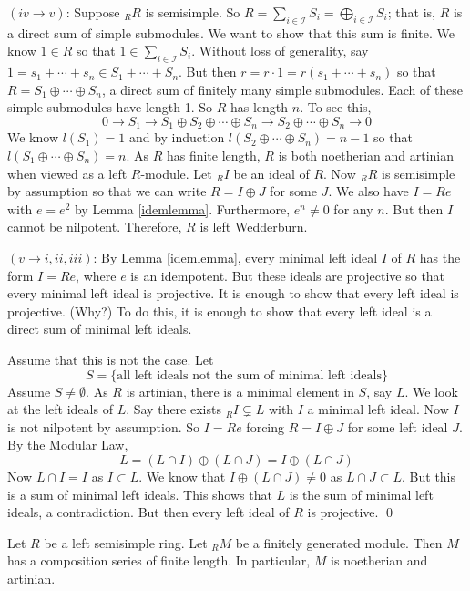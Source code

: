 $(iv \rightarrow v)$: Suppose $_R R$ is semisimple. So $R=\sum_{i \in \mathcal{I}} S_i=\bigoplus_{i \in \mathcal{I}} S_i$; that is, $R$ is a direct sum of simple submodules. We want to show that this sum is finite. We know $1 \in R$ so that $1 \in \sum_{i \in \mathcal{I}} S_i$. Without loss of generality, say $1=s_1+\cdots+s_n \in S_1+\cdots+S_n$. But then $r=r \cdot 1=r(s_1+\cdots+s_n)$ so that $R=S_1 \oplus \cdots \oplus S_n$, a direct sum of finitely many simple submodules. Each of these simple submodules have length 1. So $R$ has length $n$. To see this, 
\[
0 \longrightarrow S_1 \longrightarrow S_1 \oplus S_2 \oplus \cdots \oplus S_n \longrightarrow S_2 \oplus \cdots \oplus S_n \longrightarrow 0
\]
We know $l(S_1)=1$ and by induction $l(S_2 \oplus \cdots \oplus S_n)=n-1$ so that $l(S_1 \oplus \cdots \oplus S_n)=n$. As $R$ has finite length, $R$ is both noetherian and artinian when viewed as a left $R$-module. Let $_R I$ be an ideal of $R$. Now $_R R$ is semisimple by assumption so that we can write $R=I \oplus J$ for some $J$. We also have $I=Re$ with $e=e^2$ by Lemma \ref{idemlemma}. Furthermore, $e^n \neq 0$ for any $n$. But then $I$ cannot be nilpotent. Therefore, $R$ is left Wedderburn. 

$(v \rightarrow i,ii,iii)$: By Lemma \ref{idemlemma}, every minimal left ideal $I$ of $R$ has the form $I=Re$, where $e$ is an idempotent. But these ideals are projective so that every minimal left ideal is projective. It is enough to show that every left ideal is projective. (Why?) To do this, it is enough to show that every left ideal is a direct sum of minimal left ideals. 

Assume that this is not the case. Let 
\[
S=\{\text{all left ideals not the sum of minimal left ideals} \}
\]
Assume $S \neq \emptyset$. As $R$ is artinian, there is a minimal element in $S$, say $L$. We look at the left ideals of $L$. Say there exists $_R I \subsetneq L$ with $I$ a minimal left ideal. Now $I$ is not nilpotent by assumption. So $I=Re$ forcing $R=I \oplus J$ for some left ideal $J$. By the Modular Law,
\[
L=(L \cap I) \oplus (L \cap J)=I \oplus (L \cap J)
\]
Now $L \cap I=I$ as $I \subset L$. We know that $I \oplus (L \cap J) \neq 0$ as $L \cap J \subset L$. But this is a sum of minimal left ideals. This shows that $L$ is the sum of minimal left ideals, a contradiction. But then every left ideal of $R$ is projective. \qed \\

\begin{cor}
Let $R$ be a left semisimple ring. Let $_R M$ be a finitely generated module. Then $M$ has a composition series of finite length. In particular, $M$ is noetherian and artinian. 
\end{cor}

